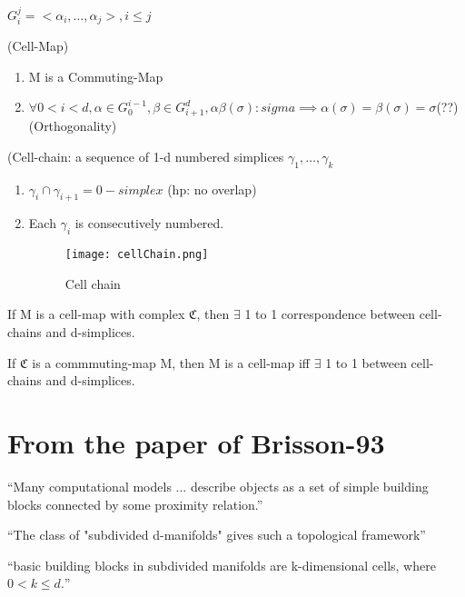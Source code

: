 \documentclass[12pt]{article}
\begin{document}
\begin{definition}
  $G_i^j = <\alpha_i, \dots, \alpha_j>, i \leq j$
\end{definition}
\begin{definition}(Cell-Map)
  \begin{enumerate}[1)]
  \item M is a Commuting-Map
  \item $\forall 0 < i < d, \alpha \in G_0^{i - 1}, \beta \in G_{i +
      1}^d, \alpha\beta(\sigma):sigma \implies \alpha(\sigma) =
    \beta(\sigma) = \sigma $(??) (Orthogonality)
  \end{enumerate}
\end{definition}
\begin{definition}(Cell-chain: a sequence of 1-d numbered simplices
  $\gamma_1, \dots, \gamma_k$
  \begin{enumerate}[1)]
  \item $\gamma_i \cap \gamma_{i + 1} = 0-simplex$ (hp: no overlap)
  \item Each $\gamma_i$ is consecutively numbered.
    \begin{figure}[h!]
      \centering
      \texttt{[image: cellChain.png]}
      \caption{Cell chain}
      \label{fig:cellChain}
    \end{figure}
  \end{enumerate}
\end{definition}
\begin{theorem}
  If M is a cell-map with complex $\mathfrak{C}$, then $\exists$ 1 to 1
  correspondence between cell-chains and d-simplices.
\end{theorem}
\begin{theorem}
  If $\mathfrak{C}$ is a commmuting-map M, then M is a cell-map iff
  $\exists$ 1 to 1 between cell-chains and d-simplices.
\end{theorem}

\section{From the paper of Brisson-93}
``Many computational models ... describe objects as a set of simple
building blocks connected by some proximity relation.''

``The class of "subdivided d-manifolds" gives such a topological
framework''

``basic building blocks in subdivided manifolds are
k-dimensional cells, where $0 < k \leq d.$''
\end{document}
